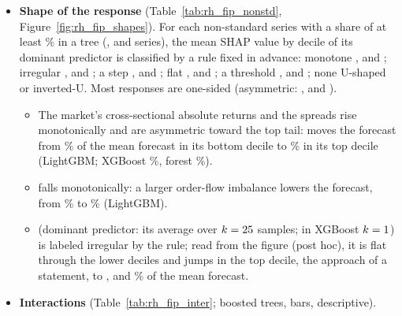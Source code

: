 \begin{itemize}
\item \textbf{Shape of the response} (Table~\ref{tab:rh_fip_nonstd}, Figure~\ref{fig:rh_fip_shapes}). For each
  non-standard series with a share of at least \rhfipShapeMin\% in a tree (\rhfipLgbmNShape, \rhfipXgbNShape{} and
  \rhfipRfNShape{} series), the mean SHAP value by decile of its dominant predictor is classified by a rule fixed in
  advance: monotone \rhfipLgbmNMono, \rhfipXgbNMono{} and \rhfipRfNMono; irregular \rhfipLgbmNIrr, \rhfipXgbNIrr{} and
  \rhfipRfNIrr; a step \rhfipLgbmNStep, \rhfipXgbNStep{} and \rhfipRfNStep; flat \rhfipLgbmNFlat, \rhfipXgbNFlat{} and
  \rhfipRfNFlat; a threshold \rhfipLgbmNThresh, \rhfipXgbNThresh{} and \rhfipRfNThresh; none U-shaped or inverted-U.
  Most responses are one-sided (asymmetric: \rhfipLgbmNAsym, \rhfipXgbNAsym{} and \rhfipRfNAsym).
  \begin{itemize}
  \item The market's cross-sectional absolute returns and the spreads rise monotonically and are asymmetric toward
    the top tail: \rhfipAbsVw{} moves the forecast from \rhfipAbsVwLgbmLo\% of the mean forecast in its bottom
    decile to \rhfipAbsVwLgbmHi\% in its top decile (LightGBM; XGBoost \rhfipAbsVwXgbHi\%, forest \rhfipAbsVwRfHi\%).
  \item \rhfipOfi{} falls monotonically: a larger order-flow imbalance lowers the forecast, from \rhfipOfiLgbmLo\% to
    \rhfipOfiLgbmHi\% (LightGBM).
  \item \rhfipFomcUntil{} (dominant predictor: its average over $k = 25$ samples; in XGBoost $k =
    1$) is labeled irregular
    by the rule; read from the figure (post hoc), it is flat through the lower deciles and jumps in the top decile,
    the approach of a statement, to \rhfipUntilLgbmHi, \rhfipUntilXgbHi{} and \rhfipUntilRfHi\% of the mean forecast.
  \end{itemize}
\item \textbf{Interactions} (Table~\ref{tab:rh_fip_inter}; boosted trees, \rhfipInterRows{} bars, descriptive).

\end{itemize}
